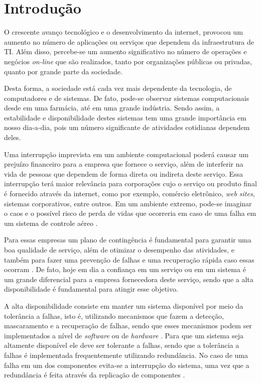 \chapter{Introdução}
O crescente avanço tecnológico e o desenvolvimento da internet, provocou um aumento no número de aplicações ou serviços que dependem da 
infraestrutura de TI. Além disso, percebe-se um aumento significativo no número de operações e negócios \textit{on-line} que são realizados, 
tanto por organizações públicas ou privadas, quanto por grande parte da sociedade.

Desta forma, a sociedade está cada vez mais dependente da tecnologia, de computadores e de sistemas. 
De fato, pode-se observar sistemas computacionais desde em uma farmácia, até em uma grande indústria. 
Sendo assim, a estabilidade e disponibilidade destes sistemas tem uma grande importância em nosso dia-a-dia, 
pois um número significante de atividades cotidianas dependem deles.

Uma interrupção imprevista em um ambiente computacional poderá causar um prejuízo financeiro para a empresa que fornece o serviço, 
além de interferir na vida de pessoas que dependem de forma direta ou indireta deste serviço. 
Essa interrupção terá maior relevância para corporações cujo o serviço ou produto final é fornecido através da internet, 
como por exemplo, comércio eletrônico, \textit{web sites}, sistemas corporativos, entre outros. 
Em um ambiente extremo, pode-se imaginar o caos e o possível risco de perda de vidas que ocorreria em caso de uma falha 
em um sistema de controle aéreo \cite{costa2009}.

Para essas empresas um plano de contingência é fundamental para garantir uma boa qualidade de serviço, além de
otimizar o desempenho das atividades, e também para fazer uma prevenção de falhas e uma recuperação rápida caso essas ocorram \cite{costa2009}.
De fato, hoje em dia a confiança em um serviço ou em um sistema é um grande diferencial para a empresa fornecedora deste serviço, 
sendo que a alta disponibilidade é fundamental para atingir esse objetivo.

A alta disponibilidade consiste em manter um sistema disponível por meio da tolerância a falhas, isto é, utilizando mecanismos que fazem a 
detecção, mascaramento e a recuperação de falhas, sendo que esses mecanismos podem ser implementados a nível de \textit{software} ou de 
\textit{hardware} \cite{reis2009}. Para que um sistema seja altamente disponível ele deve ser tolerante a falhas, sendo que a tolerância
a falhas é implementada frequentemente utilizando redundância. No caso de uma falha em um dos componentes evita-se a interrupção do sistema,
uma vez que a redundância é feita através da replicação de componentes \cite{batista2007}.

